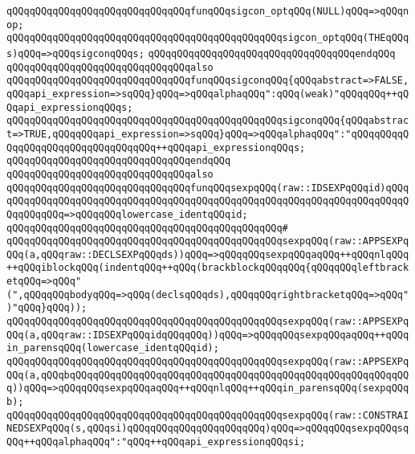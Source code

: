 \verb|qQQqqQQqqQQqqQQqqQQqqQQqqQQqqQQqfunqQQqsigcon_optqQQq(NULL)qQQq=>qQQqnop;|\newline
\verb|qQQqqQQqqQQqqQQqqQQqqQQqqQQqqQQqqQQqqQQqqQQqqQQqsigcon_optqQQq(THEqQQqs)qQQq=>qQQqsigconqQQqs;|\newline
\verb|qQQqqQQqqQQqqQQqqQQqqQQqqQQqqQQqqQQqendqQQq|\newline
\newline
\verb|qQQqqQQqqQQqqQQqqQQqqQQqqQQqqQQqalso|\newline
\verb|qQQqqQQqqQQqqQQqqQQqqQQqqQQqqQQqfunqQQqsigconqQQq{qQQqabstract=>FALSE,qQQqapi_expression=>sqQQq}qQQq=>qQQqalphaqQQq":qQQq(weak)"qQQqqQQq++qQQqapi_expressionqQQqs;|\newline
\verb|qQQqqQQqqQQqqQQqqQQqqQQqqQQqqQQqqQQqqQQqqQQqqQQqsigconqQQq{qQQqabstract=>TRUE,qQQqqQQqapi_expression=>sqQQq}qQQq=>qQQqalphaqQQq":"qQQqqQQqqQQqqQQqqQQqqQQqqQQqqQQqqQQq++qQQqapi_expressionqQQqs;|\newline
\verb|qQQqqQQqqQQqqQQqqQQqqQQqqQQqqQQqendqQQq|\newline
\newline
\verb|qQQqqQQqqQQqqQQqqQQqqQQqqQQqqQQqalso|\newline
\verb|qQQqqQQqqQQqqQQqqQQqqQQqqQQqqQQqfunqQQqsexpqQQq(raw::IDSEXPqQQqid)qQQqqQQqqQQqqQQqqQQqqQQqqQQqqQQqqQQqqQQqqQQqqQQqqQQqqQQqqQQqqQQqqQQqqQQqqQQqqQQqqQQq=>qQQqqQQqlowercase_identqQQqid;|\newline
\verb|qQQqqQQqqQQqqQQqqQQqqQQqqQQqqQQqqQQqqQQqqQQqqQQq#|\newline
\verb|qQQqqQQqqQQqqQQqqQQqqQQqqQQqqQQqqQQqqQQqqQQqqQQqsexpqQQq(raw::APPSEXPqQQq(a,qQQqraw::DECLSEXPqQQqds))qQQq=>qQQqqQQqsexpqQQqaqQQq++qQQqnlqQQq++qQQqiblockqQQq(indentqQQq++qQQq(brackblockqQQqqQQq{qQQqqQQqleftbracketqQQq=>qQQq"(",qQQqqQQqbodyqQQq=>qQQq(declsqQQqds),qQQqqQQqrightbracketqQQq=>qQQq")"qQQq}qQQq));|\newline
\verb|qQQqqQQqqQQqqQQqqQQqqQQqqQQqqQQqqQQqqQQqqQQqqQQqsexpqQQq(raw::APPSEXPqQQq(a,qQQqraw::IDSEXPqQQqidqQQqqQQq))qQQq=>qQQqqQQqsexpqQQqaqQQq++qQQqin_parensqQQq(lowercase_identqQQqid);|\newline
\verb|qQQqqQQqqQQqqQQqqQQqqQQqqQQqqQQqqQQqqQQqqQQqqQQqsexpqQQq(raw::APPSEXPqQQq(a,qQQqbqQQqqQQqqQQqqQQqqQQqqQQqqQQqqQQqqQQqqQQqqQQqqQQqqQQqqQQqqQQq))qQQq=>qQQqqQQqsexpqQQqaqQQq++qQQqnlqQQq++qQQqin_parensqQQq(sexpqQQqb);|\newline
\verb|qQQqqQQqqQQqqQQqqQQqqQQqqQQqqQQqqQQqqQQqqQQqqQQqsexpqQQq(raw::CONSTRAINEDSEXPqQQq(s,qQQqsi)qQQqqQQqqQQqqQQqqQQqqQQq)qQQq=>qQQqqQQqsexpqQQqsqQQq++qQQqalphaqQQq":"qQQq++qQQqapi_expressionqQQqsi;|\newline
